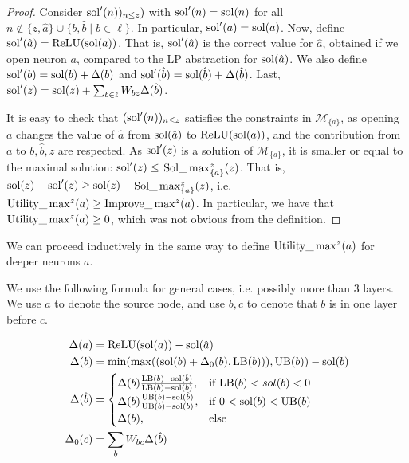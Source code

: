 	\begin{proof}
    Consider $\mathrm{sol}'(n))_{n \leq z})$ with
	$\mathrm{sol}'(n)=\mathrm{sol}(n)$ for all $n \notin \{z,\hat{a}\} \cup \{b,\hat{b} \mid b \in \ell\}$. In particular,  $\mathrm{sol}'(a) = \mathrm{sol}(a)$.
	Now, define $\mathrm{sol}'(\hat{a}) = \mathrm{ReLU}(\mathrm{sol}(a))$. 
	That is, $\mathrm{sol}'(\hat{a})$ is the correct value for $\hat{a}$, obtained if we open neuron $a$, compared to the LP abstraction for $\mathrm{sol}(\hat{a})$.
	We also define $\mathrm{sol}'(b)=\mathrm{sol}(b)+\Delta(b)$ and 
	$\mathrm{sol}'(\hat{b})=\mathrm{sol}(\hat{b}) + \Delta(\hat{b})$.
	Last, $\mathrm{sol}'(z)=\mathrm{sol}(z) + \sum_{b \in \ell} W_{bz} \Delta(\hat{b})$.
	
	It is easy to check that $(\mathrm{sol}'(n))_{n \leq z}$ satisfies the constraints in 
	$\mathcal{M}_{\{a\}}$, as opening $a$ changes the value of $\hat{a}$ from
	$\mathrm{sol}(\hat{a})$ to $\mathrm{ReLU}(\mathrm{sol}(a))$, and the contribution from $a$ to $b,\hat{b},z$ 
	are respected.
	As $\mathrm{sol}'(z)$ is a solution of $\mathcal{M}_{\{a\}}$, it is smaller or equal to the maximal solution: $\mathrm{sol}'(z) \leq$ $\mathrm{Sol}\_\max_{\{a\}}^z(z)$. That is, 
	$\mathrm{sol}(z)-\mathrm{sol}'(z) \geq \mathrm{sol}(z) -$ $\mathrm{Sol}\_\max_{\{a\}}^z(z)$, i.e. 
	$ \mathrm{Utility}\_\max^z(a) \geq \mathrm{Improve}\_\max^z(a)$.
	In particular, we have that $\mathrm{Utility}\_\max^z(a) \geq 0$, which was not obvious from the definition.
	\end{proof}
	

We can proceed inductively in the same way to define $\mathrm{Utility}\_\max^z(a)$ for deeper neurons $a$.

We use the following formula for general cases, i.e. possibly more than 3 layers. We use $a$ to denote the source node, and use $b,c$ to denote that $b$ is in one layer before $c$. 

\begin{align*}
	\Delta(a) &= \mathrm{ReLU}(\mathrm{sol}(a))-\mathrm{sol}(\hat{a})\\
		\Delta(b) &= \min(\max((\mathrm{sol}(b)+\Delta_0(b),\mathrm{LB}(b))),\mathrm{UB}(b))-\mathrm{sol}(b)\\
		\Delta(\hat{b}) &=
		\begin{cases}
		\Delta(b)\frac{\mathrm{LB}(b) - \mathrm{sol}(\hat{b})}{\mathrm{LB}(b) - \mathrm{sol}(b)},  &\text{if } \mathrm{LB}(b)< sol(b) < 0\\
		\Delta(b)\frac{\mathrm{UB}(b) - \mathrm{sol}(\hat{b})}{\mathrm{UB}(b) - \mathrm{sol}(b)},  &\text{if }  0< \mathrm{sol}(b) < \mathrm{UB}(b)\\
			\Delta(b),  &\text{else } 	 
		\end{cases}\\
	\Delta_0(c) &= \sum_{b} W_{bc}\Delta(\hat{b})
\end{align*}


